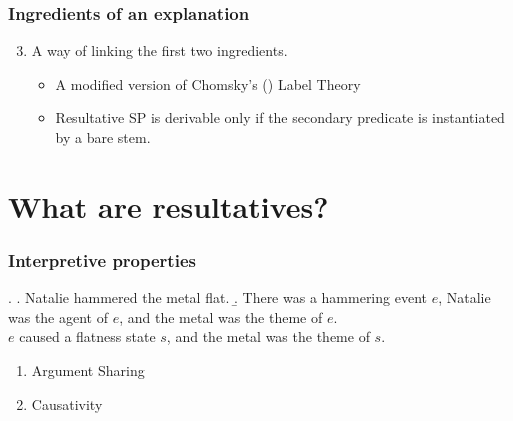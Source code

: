\documentclass[
]{beamer}
\begin{document}
\begin{frame}
  \frametitle{Ingredients of an explanation}
  \begin{enumerate}
    \setcounter{enumi}{2}  
    \item A way of linking the first two ingredients.
      \begin{itemize}
	\item A modified version of Chomsky's (\citeyear{chomsky2013problems,chomsky2015problems}) Label Theory
	\item Resultative SP is derivable only if the secondary predicate is instantiated by a bare stem.
      \end{itemize}
  \end{enumerate}
\end{frame}
\section{What are resultatives?}
\begin{frame}
  \frametitle{Interpretive properties}
  \ex.
  \a. {\rm Natalie hammered the metal flat.}
  \b. There was a hammering event $e$, Natalie was the agent of $e$, and \alert<2>{the metal} was the theme of $e$.\\
  $e$ \alert<3>{caused} a flatness state $s$, and \alert<2>{the metal} was the theme of $s$.

  \pause
  \begin{enumerate}
    \item \alert<2>{Argument Sharing}
    \item \alert<3>{Causativity}
  \end{enumerate}
\end{frame}
\end{document}
